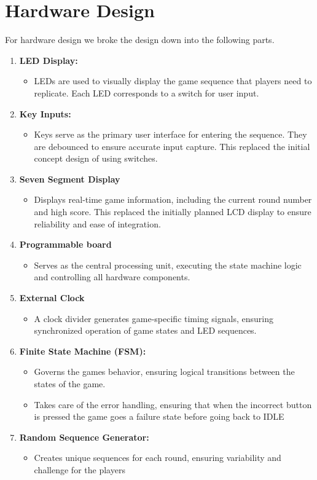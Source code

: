 \documentclass{report}
\begin{document}
\section{Hardware Design}
For hardware design we broke the design down into the following parts.
\begin{enumerate}
    \item \textbf{LED Display:}
    \begin{itemize}
        \item LEDs are used to visually display the game sequence that players need to replicate. Each LED corresponds to a switch for user input.
    \end{itemize}
    \item \textbf{Key Inputs:}
    \begin{itemize}
        \item Keys serve as the primary user interface for entering the sequence. They are debounced to ensure accurate input capture. This replaced the initial concept design of using switches.
    \end{itemize}
    \item \textbf{Seven Segment Display}
    \begin{itemize}
        \item Displays real-time game information, including the current round number and high score. This replaced the initially planned LCD display to ensure reliability and ease of integration.
    \end{itemize}
    \item \textbf{Programmable board}
    \begin{itemize}
        \item Serves as the central processing unit, executing the state machine logic and controlling all hardware components.
    \end{itemize}
    \item \textbf{External Clock}
    \begin{itemize}
        \item A clock divider generates game-specific timing signals, ensuring synchronized operation of game states and LED sequences.
    \end{itemize}
    \item \textbf{Finite State Machine (FSM):}
	\begin{itemize}
		\item Governs the games behavior, ensuring logical transitions between the states of the game.
		\item Takes care of the error handling, ensuring that when the incorrect button is pressed the game goes a failure state before going back to IDLE
	\end{itemize}
    \item \textbf{Random Sequence Generator:}
		\begin{itemize}
		\item Creates unique sequences for each round, ensuring variability and challenge for the players 
		\end{itemize}
\end{enumerate}
\end{document}
